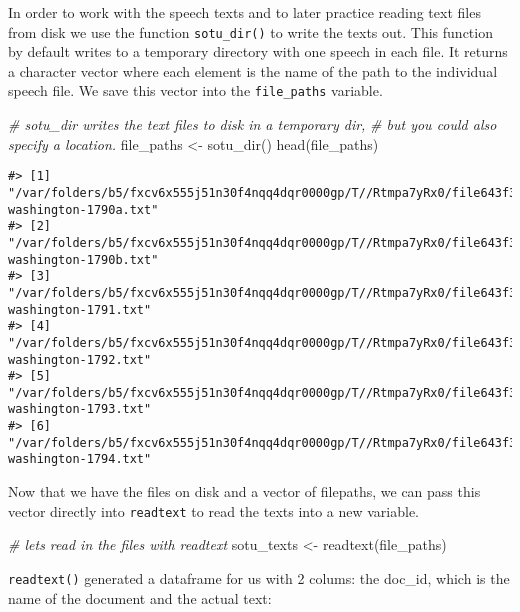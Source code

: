 \documentclass[
]{book}
\newenvironment{Shaded}{\begin{snugshade}}{\end{snugshade}}
\newcommand{\CommentTok}[1]{\textcolor[rgb]{0.56,0.35,0.01}{\textit{#1}}}
\newcommand{\FunctionTok}[1]{\textcolor[rgb]{0.00,0.00,0.00}{#1}}
\newcommand{\NormalTok}[1]{#1}
\newcommand{\OtherTok}[1]{\textcolor[rgb]{0.56,0.35,0.01}{#1}}
\begin{document}
In order to work with the speech texts and to later practice reading text files from disk we use the function \texttt{sotu\_dir()} to write the texts out. This function by default writes to a temporary directory with one speech in each file. It returns a character vector where each element is the name of the path to the individual speech file. We save this vector into the \texttt{file\_paths} variable.

\begin{Shaded}
\begin{Highlighting}[]
\CommentTok{\# sotu\_dir writes the text files to disk in a temporary dir, }
\CommentTok{\# but you could also specify a location.}
\NormalTok{file\_paths }\OtherTok{\textless{}{-}} \FunctionTok{sotu\_dir}\NormalTok{()}
\FunctionTok{head}\NormalTok{(file\_paths)}
\end{Highlighting}
\end{Shaded}

\begin{verbatim}
#> [1] "/var/folders/b5/fxcv6x555j51n30f4nqq4dqr0000gp/T//Rtmpa7yRx0/file643f362e5ae0/george-washington-1790a.txt"
#> [2] "/var/folders/b5/fxcv6x555j51n30f4nqq4dqr0000gp/T//Rtmpa7yRx0/file643f362e5ae0/george-washington-1790b.txt"
#> [3] "/var/folders/b5/fxcv6x555j51n30f4nqq4dqr0000gp/T//Rtmpa7yRx0/file643f362e5ae0/george-washington-1791.txt" 
#> [4] "/var/folders/b5/fxcv6x555j51n30f4nqq4dqr0000gp/T//Rtmpa7yRx0/file643f362e5ae0/george-washington-1792.txt" 
#> [5] "/var/folders/b5/fxcv6x555j51n30f4nqq4dqr0000gp/T//Rtmpa7yRx0/file643f362e5ae0/george-washington-1793.txt" 
#> [6] "/var/folders/b5/fxcv6x555j51n30f4nqq4dqr0000gp/T//Rtmpa7yRx0/file643f362e5ae0/george-washington-1794.txt"
\end{verbatim}

Now that we have the files on disk and a vector of filepaths, we can pass this vector directly into \texttt{readtext} to read the texts into a new variable.

\begin{Shaded}
\begin{Highlighting}[]
\CommentTok{\# let\textquotesingle{}s read in the files with readtext}
\NormalTok{sotu\_texts }\OtherTok{\textless{}{-}} \FunctionTok{readtext}\NormalTok{(file\_paths)}
\end{Highlighting}
\end{Shaded}

\texttt{readtext()} generated a dataframe for us with 2 colums: the doc\_id, which is the name of the document and the actual text:
\end{document}
